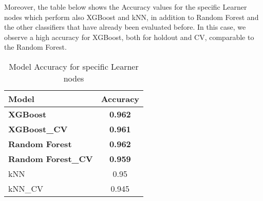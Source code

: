 Moreover, the table below shows the Accuracy values for the specific Learner nodes which perform also XGBoost and kNN, in addition to Random Forest and the other classifiers that have already been evaluated before. In this case, we observe a high accuracy for XGBoost, both for holdout and CV, comparable to the Random Forest. 
\begin{table}[H]
\centering
\label{tab:other_classifiers_specific}
\begin{tabular}{|l|c|}
\hline
\textbf{Model} & \textbf{Accuracy} \\ \hline
\textbf{XGBoost} & \textbf{0.962} \\ \hline
\textbf{XGBoost\_CV} & \textbf{0.961} \\ \hline
\textbf{Random Forest} & \textbf{0.962} \\ \hline
\textbf{Random Forest\_CV} & \textbf{0.959} \\ \hline
kNN & 0.95 \\ \hline
kNN\_CV & 0.945 \\ \hline
\end{tabular}
\caption{Model Accuracy for specific Learner nodes}
\end{table}
